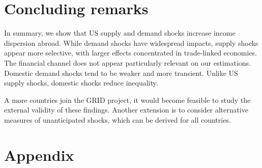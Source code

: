 \documentclass[12pt, a4paper]{article}
\begin{document}
\section{Concluding remarks}
In summary, we show that US supply and demand shocks increase income dispersion abroad. While demand shocks have widespread impacts, supply shocks appear more selective, with larger effects concentrated in trade-linked economies. The financial channel does not appear particularly relevant on our estimations. Domestic demand shocks tend to be weaker and more transient. Unlike US supply shocks, domestic shocks reduce inequality.

A more countries join the GRID project, it would become feasible to study the external validity of these findings. Another extension is to consider alternative measures of unanticipated shocks, which can be derived for all countries. 

\newpage
\printbibliography
\pagebreak
\section*{Appendix}
\renewcommand{\thetable}{A\arabic{table}}
\renewcommand{\thefigure}{B\arabic{figure}}
\setcounter{figure}{0}
\setcounter{table}{0}
\end{document}
